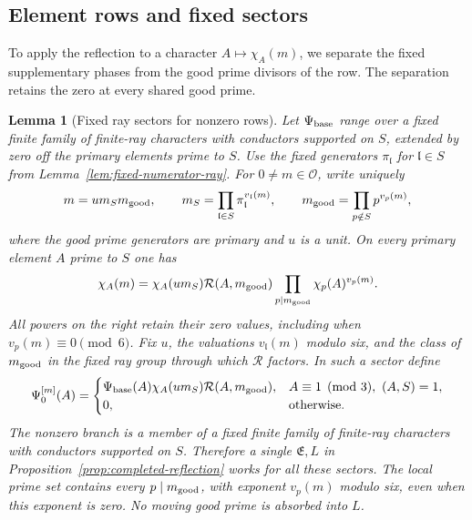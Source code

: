 \documentclass[11pt,a4paper]{article}
\numberwithin{equation}{section}
\numberwithin{figure}{section}
\newtheorem{lemma}[theorem]{Lemma}
\theoremstyle{definition}
\theoremstyle{remark}
\begin{document}
\subsection{Element rows and fixed sectors}

To apply the reflection to a character $A\mapsto\chi_A(m)$, we separate
the fixed supplementary phases from the good prime divisors of the row.
The separation retains the zero at every shared good prime.

\begin{lemma}[Fixed ray sectors for nonzero rows]
\label{lem:reflection-row-sectors}
Let $\Psi_{\rm base}$ range over a fixed finite family of finite-ray
characters with conductors supported on $S$, extended by zero off the primary
elements prime to $S$.  Use the fixed generators $\pi_{\mathfrak l}$ for $\mathfrak l\in S$
from Lemma~\ref{lem:fixed-numerator-ray}.
For $0\ne m\in\mathcal O$, write uniquely
\[
 m=u m_Sm_{\rm good},\qquad
 m_S=\prod_{\mathfrak l\in S}\pi_{\mathfrak l}^{v_{\mathfrak l}(m)},\qquad
 m_{\rm good}=\prod_{p\notin S}p^{v_p(m)},
\]
where the good prime generators are primary and $u$ is a unit.  On every
primary element $A$ prime to $S$ one has
\begin{equation}\label{eq:reflection-row-reduction}
 \chi_A(m)=\chi_A(u m_S)\mathcal R(A,m_{\rm good})
       \prod_{p\mid m_{\rm good}}\chi_p(A)^{v_p(m)}.
\end{equation}
All powers on the right retain their zero values, including when
$v_p(m)\equiv0\pmod6$.  Fix $u$, the valuations $v_{\mathfrak l}(m)$ modulo six,
and the class of $m_{\rm good}$ in the fixed ray group through which
$\mathcal R$ factors.  In such a sector define
\begin{equation}\label{eq:reflection-sector-character}
 \Psi_0^{[m]}(A)=
 \begin{cases}
 \Psi_{\rm base}(A)\chi_A(u m_S)\mathcal R(A,m_{\rm good}),
       &A\equiv1\pmod3,\ (A,S)=1,\\
 0,&\text{otherwise}.
 \end{cases}
\end{equation}
The nonzero branch is a member of a fixed finite family of finite-ray
characters with conductors supported on $S$.  Therefore a single
$\mathfrak E,L$ in Proposition~\ref{prop:completed-reflection} works for all
these sectors.  The local prime set contains every $p\mid m_{\rm good}$,
with exponent $v_p(m)$ modulo six, even when this exponent is zero.
No moving good prime is absorbed into $L$.
\end{lemma}
\end{document}

